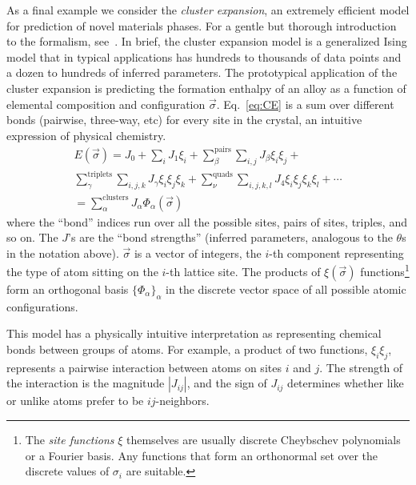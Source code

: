 \documentclass[twocolumn,aps,prx,superscriptaddress,10pt]{revtex4-2}
\newcommand{\0}{\bm{0}}
\begin{document}
As a final example we consider the \emph{cluster expansion}, an extremely efficient model for prediction of novel materials phases. For a gentle but thorough introduction to the formalism, see~\cite{lerch2009uncle}. In brief, the cluster expansion model is a generalized Ising model \cite{sanchez1984generalized,sanchez1993cluster,sanchez2010cluster,zunger1994statics,van2002alloy,mueller2009bayesian,aangqvist2019icet,seko2006prediction} that in typical applications has hundreds to thousands of data points and a dozen to hundreds of inferred parameters. The prototypical application of the cluster expansion is predicting the formation enthalpy of an alloy as a function of elemental composition and configuration $\vec\sigma$. Eq.~\eqref{eq:CE} is a sum over different bonds (pairwise, three-way, etc) for every site in the crystal, an intuitive expression of physical chemistry.
\begin{multline}
\label{eq:CE}
E(\vec\sigma)  = J_0+\sum_{i} J_1 \xi_i + \sum_{\beta}^{\textrm{pairs}} \sum_{i,j} J_\beta \xi_i\xi_j +\\\sum_{\gamma}^{\textrm{triplets}}\sum_{i,j,k} J_\gamma \xi_i\xi_j\xi_k
+\sum_\nu^{\textrm{quads}}\sum_{i,j,k,l} J_4 \xi_i\xi_j\xi_k\xi_l + \cdots \\
= \sum_{\alpha}^\mathrm{clusters}J_{\alpha} \Phi_{\alpha}(\vec \sigma)\qquad
\end{multline}
where the ``bond'' indices run over all the possible sites, pairs of sites, triples, and so on.
The $J$'s are the ``bond strengths'' (inferred parameters, analogous to the $\theta$s in the notation above). $\vec\sigma$ is a vector of integers, the $i$-th component representing the type of atom sitting on the $i$-th lattice site.  The products of $\xi(\vec\sigma)$ functions\footnote{The \emph{site functions} $\xi$ themselves are usually discrete Cheybschev polynomials or a Fourier basis. Any functions that form an orthonormal set over the discrete values of $\sigma_i$ are suitable.} form an orthogonal basis
$\{\Phi_\alpha\}_\alpha$ in the discrete vector space of all possible atomic configurations. 

This model has a physically intuitive interpretation as representing chemical bonds between groups of atoms. For example, a product of two functions, $\xi_i\xi_j$,  represents a pairwise interaction between atoms on sites $i$ and $j$. The strength of the interaction is the magnitude %
$|J_{ij}|$, and the sign of $J_{ij}$ determines whether like or unlike atoms prefer to be ${ij}$-neighbors. 
\end{document}
